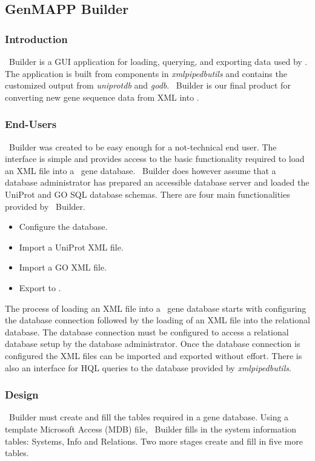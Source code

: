 \subsection{GenMAPP Builder}
\label{gmbuilder}

\subsubsection{Introduction}
\genmapp~Builder is a GUI application for loading, querying, and exporting data
used by \genmapp. The application is built from components in \emph{xmlpipedbutils} and contains the customized output from \emph{uniprotdb} and \emph{godb}. \genmapp~Builder is our final product for converting new gene sequence data from XML into \genmapp.

\subsubsection{End-Users}
\genmapp~Builder was created to be easy enough for a not-technical end user.  The interface is simple and provides access to the basic functionality required to load an XML file into a \genmapp~gene database.  \genmapp~Builder does however assume that a database administrator has prepared an accessible database server and loaded the UniProt and GO SQL database schemas.  There are four main functionalities provided by \genmapp~Builder.
\begin{itemize}
	\item {Configure the database.}
	\item {Import a UniProt XML file. }
	\item {Import a GO XML file.}
	\item {Export to \genmapp.}
\end{itemize}
The process of loading an XML file into a \genmapp~gene database starts with configuring the database connection followed by the loading of an XML file into the relational database.  The database connection must be configured to access a relational database setup by the database administrator.  Once the database connection is configured the XML files can be imported and exported without effort.  There is also an interface for HQL queries to the database provided by \emph{xmlpipedbutils}.

\subsubsection{Design}
\genmapp~Builder must create and fill the tables required in a \genmapp gene database.  Using a template Microsoft Access (MDB) file, \genmapp~Builder fills in the system information tables: Systems, Info and Relations.  Two more stages create and fill in five more tables.

